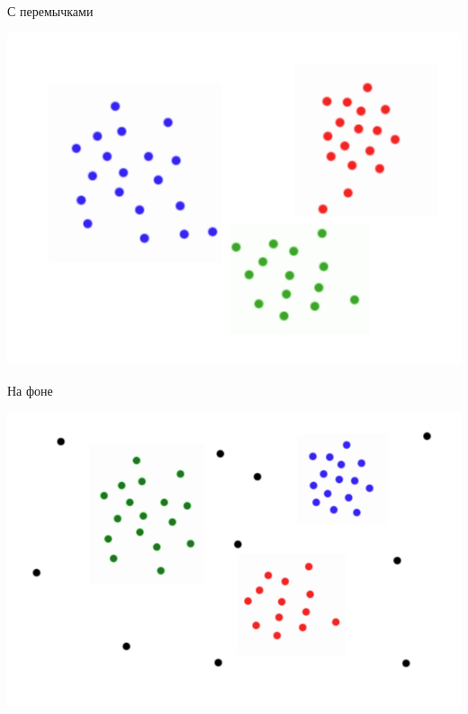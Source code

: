 \documentclass[10pt]{beamer}
\begin{document}
\begin{frame}{С перемычками}
	\begin{center}
	  \includegraphics[height=0.6 \textheight, keepaspectratio = true]{images/cluster4}  
	\end{center}
\end{frame}

\begin{frame}{На фоне}
	\begin{center}
	  \includegraphics[height=0.6 \textheight, keepaspectratio = true]{images/cluster5}  
	\end{center}
\end{frame}
\end{document}
